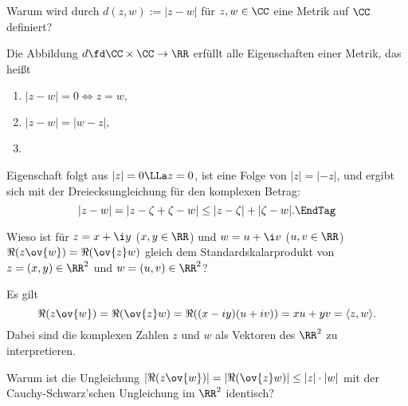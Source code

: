 \begin{frage}
  Warum wird durch $d(z,w):=|z-w|$ für $z,w\in\CC$ eine Metrik auf 
  $\CC$ definiert?
\end{frage} 

\begin{antwort}
  Die Abbildung $d\fd\CC\times \CC\to \RR$ erfüllt alle Eigenschaften einer 
  Metrik, das heißt
  {\setlength{\labelsep}{8mm}
    \begin{enumerate}
    \item[\desc{M1}] $|z-w|=0 \Longleftrightarrow z=w,$ \\[-3,5mm]
    \item[\desc{M2}] $|z-w|=|w-z|,$\\[-3.5mm]
    \item[\desc{M3}] 
    \end{enumerate}
  }
  \noindent
  Eigenschaft  folgt aus $|z|=0 \LLa z=0$, 
   ist eine Folge von $|z|=|-z|$, und  ergibt sich 
  mit der Dreiecksungleichung für den komplexen Betrag:
  \begin{equation}
    |z-w| = |z - \zeta +\zeta - w| \le |z-\zeta|+|\zeta-w|. \EndTag
  \end{equation}
\end{antwort}






\begin{frage}
  Wieso ist für $z=x+\i y$ ($x,y\in\RR$) und $w=u+\i v$ ($u,v\in\RR$)
  $\Re(z\ov{w})=\Re(\ov{z}w)$ gleich dem Standardskalarprodukt 
  von $z=(x,y)\in\RR^2$ und $w=(u,v)\in\RR^2$?
\end{frage}

\begin{antwort}
  Es gilt 
  \[
  \Re (z\ov{w})= \Re(\ov{z}w)= 
  \Re ( (x-iy)(u+iv)) = xu +yv=\langle z, w \rangle.
  \]
  Dabei sind die komplexen Zahlen $z$ und $w$ als Vektoren 
  des $\RR^2$ zu interpretieren. 
  \AntEnd
\end{antwort}






\begin{frage}
  Warum ist die Ungleichung 
  $|\Re(z\ov{w})|=|\Re(\ov{z}w)|\le |z| \cdot |w|$ mit der 
  Cauchy-Schwarz'schen 
  Ungleichung im $\RR^2$ identisch?
\end{frage}

